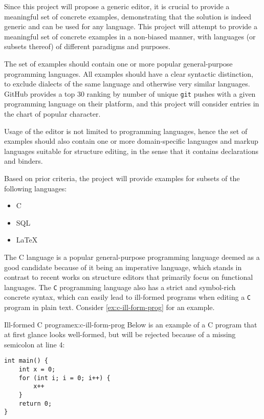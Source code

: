 Since this project will propose a generic editor, it is crucial to provide a meaningful set of concrete examples, demonstrating that the solution is indeed generic and can be used for any language.
This project will attempt to provide a meaningful set of concrete examples in a non-biased manner, with languages (or subsets thereof) of different paradigms and purposes.

The set of examples should contain one or more popular general-purpose programming languages.
All examples should have a clear syntactic distinction, to exclude dialects of the same language and otherwise very similar languages. \\ GitHub provides a top 30 ranking\cite{prog-lang-metrics} by number of unique \texttt{git} pushes with a given programming language on their platform, and this project will consider entries in the chart of popular character.

Usage of the editor is not limited to programming languages, hence the set of examples should also contain one or more domain-specific languages and markup languages suitable for structure editing, in the sense that it contains declarations and binders.

Based on prior criteria, the project will provide examples for subsets of the following languages:
\begin{itemize}
    \item C
    \item SQL
    \item \LaTeX
\end{itemize}

The C language\cite{c-iso-standard} is a popular general-purpose programming language deemed as a good candidate because of it being an imperative language, which stands in contrast to recent works on structure editors\cite{aalborg}\cite{godiksen}\cite{omar} that primarily focus on functional languages. The \texttt{C} programming language also has a strict and symbol-rich concrete syntax, which can easily lead to ill-formed programs when editing a \texttt{C} program in plain text. Consider \cref{ex:c-ill-form-prog} for an example.

\begin{myfigure}{Ill-formed C program}{ex:c-ill-form-prog}
    Below is an example of a C program that at first glance looks well-formed, but will be rejected because of a missing semicolon at line 4:
    \begin{lstlisting}[style=figurestyle]
int main() {
    int x = 0;
    for (int i; i = 0; i++) {
        x++
    }
    return 0;
}
    \end{lstlisting}
\end{myfigure}

